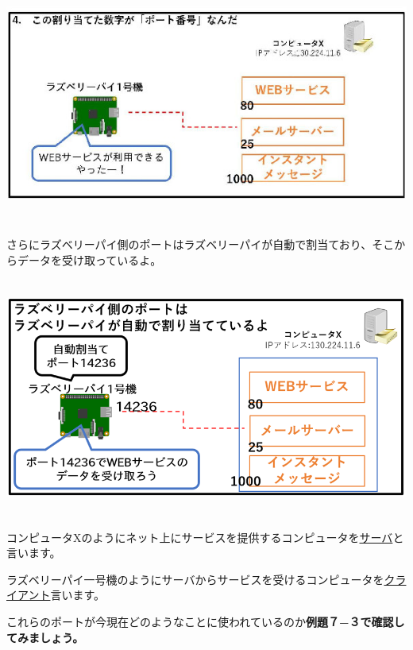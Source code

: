 \documentclass[a4paper,12pt,dvipdfmx]{jarticle}
\begin{document}
\centering
\includegraphics[width=16.875cm,height=7.978cm]{ome7-img024}
\flushleft


\bigskip


\bigskip


\bigskip

さらにラズベリーパイ側のポートはラズベリーパイが自動で割当ており、そこからデータを受け取っているよ。


\bigskip


\bigskip


\bigskip



\centering
\includegraphics[width=15.847cm,height=7.853cm]{ome7-img025.png}
\flushleft

コンピュータXのようにネット上にサービスを提供するコンピュータを\underline{サーバ}と言います。

ラズベリーパイ一号機のようにサーバからサービスを受けるコンピュータを\underline{クライアント}言います。


\bigskip

これらのポートが今現在どのようなことに使われているのか\textbf{例題７−３で確認してみましょう。}
\end{document}
